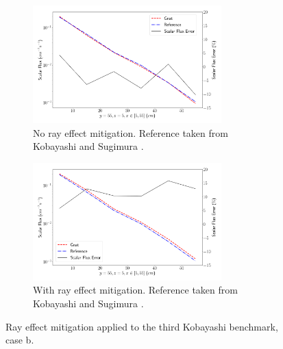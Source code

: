 \begin{figure}[H]
    \centering
    \begin{subfigure}[b]{\textwidth}
        \centering
        \includegraphics[width=0.8\textwidth]{images/verification/rt_kobayashi/kobayashi_3b_no_rt.png}
        \caption{No ray effect mitigation. Reference taken from Kobayashi and Sugimura \cite{kobayashi_benchmarks}.}
        \label{fig:verification:rt:kobayashi_3b:no_rt}
    \end{subfigure}
    \hfill
    \begin{subfigure}[b]{\textwidth}
        \centering
        \includegraphics[width=0.8\textwidth]{images/verification/rt_kobayashi/kobayashi_3b_rt.png}
        \caption{With ray effect mitigation. Reference taken from Kobayashi and Sugimura \cite{kobayashi_benchmarks}.}
        \label{fig:verification:rt:kobayashi_3b:rt}
    \end{subfigure}
    \caption{Ray effect mitigation applied to the third Kobayashi benchmark, case b.}
    \label{fig:verification:rt:kobayashi_3b}
\end{figure}

